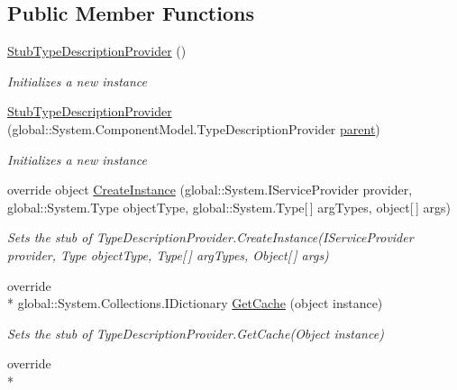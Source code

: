 \subsection*{Public Member Functions}
\begin{DoxyCompactItemize}
\item 
\hyperlink{class_system_1_1_component_model_1_1_fakes_1_1_stub_type_description_provider_a41f16fa9b7393729f95a9d9528b5919e}{Stub\-Type\-Description\-Provider} ()
\begin{DoxyCompactList}\small\item\em Initializes a new instance\end{DoxyCompactList}\item 
\hyperlink{class_system_1_1_component_model_1_1_fakes_1_1_stub_type_description_provider_a5e6012da18638baa4c7abcf8a6f3737c}{Stub\-Type\-Description\-Provider} (global\-::\-System.\-Component\-Model.\-Type\-Description\-Provider \hyperlink{jquery-1_810_82-vsdoc_8js_aed9b5e7a755bcccb282f9b06c00a6822}{parent})
\begin{DoxyCompactList}\small\item\em Initializes a new instance\end{DoxyCompactList}\item 
override object \hyperlink{class_system_1_1_component_model_1_1_fakes_1_1_stub_type_description_provider_a938ba21a2fb679cc1348dbc57acef198}{Create\-Instance} (global\-::\-System.\-I\-Service\-Provider provider, global\-::\-System.\-Type object\-Type, global\-::\-System.\-Type\mbox{[}$\,$\mbox{]} arg\-Types, object\mbox{[}$\,$\mbox{]} args)
\begin{DoxyCompactList}\small\item\em Sets the stub of Type\-Description\-Provider.\-Create\-Instance(\-I\-Service\-Provider provider, Type object\-Type, Type\mbox{[}$\,$\mbox{]} arg\-Types, Object\mbox{[}$\,$\mbox{]} args)\end{DoxyCompactList}\item 
override \\*
global\-::\-System.\-Collections.\-I\-Dictionary \hyperlink{class_system_1_1_component_model_1_1_fakes_1_1_stub_type_description_provider_a446335e950eccc1e53da767c98284463}{Get\-Cache} (object instance)
\begin{DoxyCompactList}\small\item\em Sets the stub of Type\-Description\-Provider.\-Get\-Cache(\-Object instance)\end{DoxyCompactList}\item 
override \\*

\end{DoxyCompactItemize}

